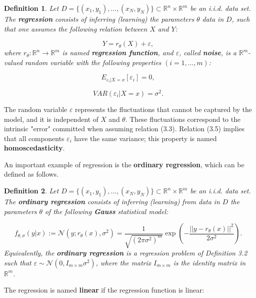 \documentclass{report}
\newtheorem{definition}{Definition}[chapter]
\begin{document}
\begin{definition}
Let $D = \{(x_1,y_1),\dots,(x_N,y_N)\} \subset \mathbb{R}^n \times \mathbb{R}^m$ be an i.i.d. data set. The \textbf{regression} consists of inferring (learning) the parameters $\theta$ data in $D$, such that one assumes the following relation between $X$ and $Y$:

\begin{equation}
Y = r_\theta(X) + \varepsilon,
\end{equation}
where $r_\theta : \mathbb{R}^n \to \mathbb{R}^m$ is named \textbf{regression function}, and $\varepsilon$, called \textbf{noise}, is a $\mathbb{R}^m$-valued random variable with the following properties $(i = 1,\dots,m)$:

\begin{equation}
E_{\varepsilon_i|X = x}[\varepsilon_i] = 0,
\end{equation}

\begin{equation}
VAR(\varepsilon_i|X = x) = \sigma^2.
\end{equation}
\end{definition}
The random variable $\varepsilon$ represents the fluctuations that cannot be captured by the model, and it is independent of $X$ and $\theta$. These fluctuations correspond to the intrinsic "error" committed when assuming relation (3.3). Relation (3.5) implies that all components $\varepsilon_i$ have the same variance; this property is named \textbf{homoscedasticity}.

An important example of regression is the \textbf{ordinary regression}, which can be defined as follows.

\begin{definition}
Let $D = \{(x_1,y_1),\dots,(x_N,y_N)\} \subset \mathbb{R}^n \times \mathbb{R}^m$ be an i.i.d. data set. The \textbf{ordinary regression} consists of inferring (learning) from data in $D$ the parameters $\theta$ of the following \textbf{Gauss} statistical model:

\begin{equation}
f_{\theta,\sigma}(y|x) := \mathcal{N}(y;r_\theta(x),\sigma^2) = \frac{1}{\sqrt{(2\pi\sigma^2)^m}}\exp\left(-\frac{||y-r_\theta(x)||^2}{2\sigma^2}\right).
\end{equation}
Equivalently, the \textbf{ordinary regression} is a regression problem of Definition 3.2 such that $\varepsilon \sim \mathcal{N}(0,I_{m\times m}\sigma^2)$, where the matrix $I_{m\times m}$ is the identity matrix in $\mathbb{R}^m$.
\end{definition}
The regression is named \textbf{linear} if the regression function is linear:
\end{document}
